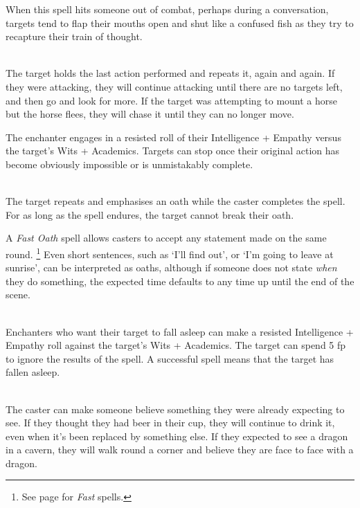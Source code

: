 \begin{multicols}{2}
{When this spell hits someone out of combat, perhaps during a conversation, targets tend to flap their mouths open and shut like a confused fish as they try to recapture their train of thought.

}{}

\\
The target holds the last action performed and repeats it, again and again.
If they were attacking, they will continue attacking until there are no targets left, and then go and look for more.
If the target was attempting to mount a horse but the horse flees, they will chase it until they can no longer move.

The enchanter engages in a resisted roll of their Intelligence + Empathy versus the target's Wits + Academics.
Targets can stop once their original action has become obviously impossible or is unmistakably complete.

\\
The target repeats and emphasises an oath while the caster completes the spell.
For as long as the spell endures, the target cannot break their oath.

A \textit{Fast Oath} spell allows casters to accept any statement made on the same round.%
\footnote{See page \pageref{fast} for \textit{Fast} spells.}
Even short sentences, such as `I'll find out', or `I'm going to leave at sunrise', can be interpreted as oaths, although if someone does not state \textit{when} they do something, the expected time defaults to any time up until the end of the scene.

\spelllevel

\\
Enchanters who want their target to fall asleep can make a resisted Intelligence + Empathy roll against the target's Wits + Academics.
The target can spend 5 \gls{fp} to ignore the results of the spell. A successful spell means that the target has fallen asleep.

\\
The caster can make someone believe something they were already expecting to see.
If they thought they had beer in their cup, they will continue to drink it, even when it's been replaced by something else.
If they expected to see a dragon in a cavern, they will walk round a corner and believe they are face to face with a dragon.


\end{multicols}
